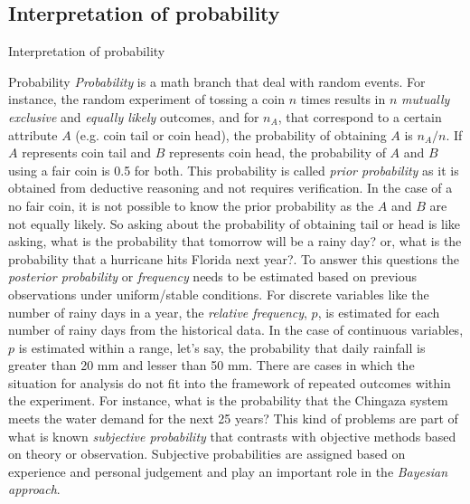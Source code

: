 \documentclass[8pt]{beamer}
\begin{document}
\subsection{Interpretation of probability}
\begin{frame}{Interpretation of probability}
    \begin{block}{Probability}
        \emph{Probability} is a math branch that deal with random events. For instance, the random experiment of tossing a coin $n$ times results in $n$ \emph{mutually exclusive} and \emph{equally likely} outcomes, and for $n_A$, that correspond to a certain attribute $A$ (e.g. coin tail or coin head), the probability of obtaining $A$ is $n_A / n$. If $A$ represents coin tail and $B$ represents coin head, the probability of $A$ and $B$ using a fair coin is 0.5 for both. This probability is called \emph{prior probability} as it is obtained from deductive reasoning and not requires verification. In the case of a no fair coin, it is not possible to know the prior probability as the $A$ and $B$ are not equally likely. So asking about the probability of obtaining tail or head is like asking, what is the probability that tomorrow will be a rainy day? or, what is the probability that a hurricane hits Florida next year?. To answer this questions the \emph{posterior probability} or \emph{frequency} needs to be estimated based on previous observations under uniform/stable conditions. For discrete variables like the number of rainy days in a year, the \emph{relative frequency}, $p$, is  estimated for each number of rainy days from the historical data. In the case of continuous variables, $p$ is estimated within a range, let's say, the probability that daily rainfall is greater than 20 mm and lesser than 50 mm. There are cases in which the situation for analysis do not fit into the framework of repeated outcomes within the experiment. For instance, what is the probability that the Chingaza system meets the water demand for the next 25 years?  This kind of problems are part of what is known \emph{subjective probability} that contrasts with objective methods based on theory or observation. Subjective probabilities are assigned based on experience and personal judgement and play an important role in the \emph{Bayesian approach}. 
    \end{block}
\end{frame}
\end{document}
